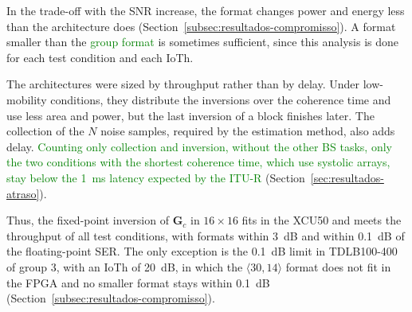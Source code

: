 In the trade-off with the SNR increase, the format changes power and energy less than the architecture does (Section~\ref{subsec:resultados-compromisso}). A format smaller than the \textcolor{GREEN}{group format} is sometimes sufficient, since this analysis is done for each test condition and each IoTh.

The architectures were sized by throughput rather than by delay. Under low-mobility conditions, they distribute the inversions over the coherence time and use less area and power, but the last inversion of a block finishes later. The collection of the $N$ noise samples, required by the estimation method, also adds delay. \textcolor{GREEN}{Counting only collection and inversion, without the other BS tasks, only the two conditions with the shortest coherence time, which use systolic arrays, stay below the 1~ms latency expected by the ITU-R} (Section~\ref{sec:resultados-atraso}).

Thus, the fixed-point inversion of $\mathbf G_c$ in $16 \times 16$ fits in the XCU50 and meets the throughput of all test conditions, with formats within 3~dB and within 0.1~dB of the floating-point SER. The only exception is the 0.1~dB limit in TDLB100-400 of group 3, with an IoTh of 20~dB, in which the $\langle 30,14\rangle$ format does not fit in the FPGA and no smaller format stays within 0.1~dB (Section~\ref{subsec:resultados-compromisso}).

